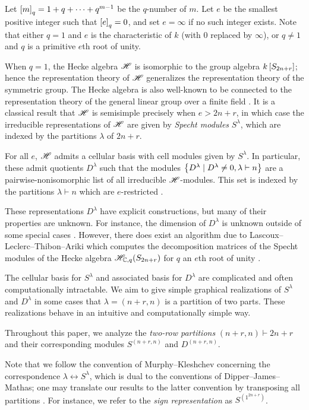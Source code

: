 \documentclass{amsart}
\begin{document}
  Let $\left[ m \right]_q = 1 + q + \dots + q^{m-1}$ be the $q$-number of $m$. 
  Let $e$ be the smallest positive integer such that $\left[ e \right]_q = 0$, and set $e = \infty$ if no such integer exists.
  Note that either $q = 1$ and $e$ is the characteristic of $k$ (with $0$ replaced by $\infty$), or $q \neq 1$ and $q$ is a primitive $e$th root of unity.

  \vspace{5pt}
  When $q = 1$, the Hecke algebra $\mathscr{H}$ is isomorphic to the group algebra $k\left[ S_{2n+r} \right]$;
  hence the representation theory of $\mathscr{H}$ generalizes the representation theory of the symmetric group.
  The Hecke algebra is also well-known to be connected to the representation theory of the general linear group over a finite field \cite{Mathas-book}.
  It is a classical result that $\mathscr{H}$ is semisimple precisely when $e > 2n + r$, in which case the irreducible representations of $\mathscr{H}$ are given by \emph{Specht modules} $S^\lambda$, which are indexed by the partitions $\lambda$ of $2n + r$.
  
  For all $e$, $\mathscr{H}$ admits a cellular basis with cell modules given by $S^\lambda$.
  In particular, these admit quotients $D^\lambda$ such that the modules $\left\{ D^\lambda \mid D^\lambda \neq 0, \lambda \vdash n \right\}$ are a pairwise-nonisomorphic list of all irreducible $\mathscr{H}$-modules.
  This set is indexed by the partitions $\lambda \vdash n$ which are $e$-restricted \cite{Murphy1,Murphy2}.
  
  These representations $D^\lambda$ have explicit constructions, but many of their properties are unknown.
  For instance, the dimension of $D^\lambda$ is unknown outside of some special cases \cite{Mathas-book}.
  However, there does exist an algorithm due to Lascoux--Leclerc--Thibon--Ariki which computes the decomposition matrices of the Specht modules of the Hecke algebra $\mathscr{H}_{\mathbb{C},q}(S_{2n + r})$ for $q$ an $e$th root of unity \cite{LLT,Ariki}.
  
  The cellular basis for $S^\lambda$ and associated basis for $D^\lambda$ are complicated and often computationally intractable.
  We aim to give simple graphical realizations of $S^\lambda$ and $D^\lambda$ in some cases that $\lambda = (n+r,n)$ is a partition of two parts.
  These realizations behave in an intuitive and computationally simple way.

  \vspace{5pt}
  Throughout this paper, we analyze the \emph{two-row partitions} $(n+r,n) \vdash 2n + r$ and their corresponding modules $S^{(n+r,n)}$ and $D^{(n+r,n)}$.
  \begin{remark}
    Note that we follow the convention of Murphy--Kleshchev concerning the correspondence $\lambda \leftrightarrow S^\lambda$, which is dual to the conventions of Dipper--James--Mathas;
    one may translate our results to the latter convention by transposing all partitions \cite{Kleshchev,Mathas-book,Murphy1}. 
    For instance, we refer to the \emph{sign representation} as $S^{(1^{2n + r})}$.
  \end{remark}
\end{document}

